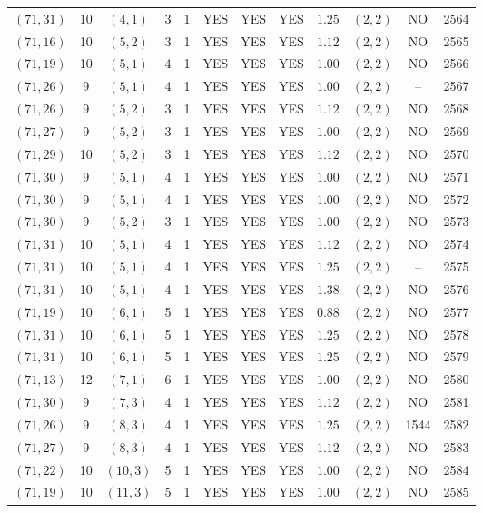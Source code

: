 \begin{longtable}{|c|c|c|c|c|c|c|c|c|c|c|c|}
$(71,31)$ & 10 & $(4,1)$ & 3 & 1 & YES & YES & YES & $1.25$ & $(2,2)$ & NO & 2564\\
$(71,16)$ & 10 & $(5,2)$ & 3 & 1 & YES & YES & YES & $1.12$ & $(2,2)$ & NO & 2565\\
$(71,19)$ & 10 & $(5,1)$ & 4 & 1 & YES & YES & YES & $1.00$ & $(2,2)$ & NO & 2566\\
$(71,26)$ & 9 & $(5,1)$ & 4 & 1 & YES & YES & YES & $1.00$ & $(2,2)$ & -- & 2567\\
$(71,26)$ & 9 & $(5,2)$ & 3 & 1 & YES & YES & YES & $1.12$ & $(2,2)$ & NO & 2568\\
$(71,27)$ & 9 & $(5,2)$ & 3 & 1 & YES & YES & YES & $1.00$ & $(2,2)$ & NO & 2569\\
$(71,29)$ & 10 & $(5,2)$ & 3 & 1 & YES & YES & YES & $1.12$ & $(2,2)$ & NO & 2570\\
$(71,30)$ & 9 & $(5,1)$ & 4 & 1 & YES & YES & YES & $1.00$ & $(2,2)$ & NO & 2571\\
$(71,30)$ & 9 & $(5,1)$ & 4 & 1 & YES & YES & YES & $1.00$ & $(2,2)$ & NO & 2572\\
$(71,30)$ & 9 & $(5,2)$ & 3 & 1 & YES & YES & YES & $1.00$ & $(2,2)$ & NO & 2573\\
$(71,31)$ & 10 & $(5,1)$ & 4 & 1 & YES & YES & YES & $1.12$ & $(2,2)$ & NO & 2574\\
$(71,31)$ & 10 & $(5,1)$ & 4 & 1 & YES & YES & YES & $1.25$ & $(2,2)$ & -- & 2575\\
$(71,31)$ & 10 & $(5,1)$ & 4 & 1 & YES & YES & YES & $1.38$ & $(2,2)$ & NO & 2576\\
$(71,19)$ & 10 & $(6,1)$ & 5 & 1 & YES & YES & YES & $0.88$ & $(2,2)$ & NO & 2577\\
$(71,31)$ & 10 & $(6,1)$ & 5 & 1 & YES & YES & YES & $1.25$ & $(2,2)$ & NO & 2578\\
$(71,31)$ & 10 & $(6,1)$ & 5 & 1 & YES & YES & YES & $1.25$ & $(2,2)$ & NO & 2579\\
$(71,13)$ & 12 & $(7,1)$ & 6 & 1 & YES & YES & YES & $1.00$ & $(2,2)$ & NO & 2580\\
$(71,30)$ & 9 & $(7,3)$ & 4 & 1 & YES & YES & YES & $1.12$ & $(2,2)$ & NO & 2581\\
$(71,26)$ & 9 & $(8,3)$ & 4 & 1 & YES & YES & YES & $1.25$ & $(2,2)$ & 1544 & 2582\\
$(71,27)$ & 9 & $(8,3)$ & 4 & 1 & YES & YES & YES & $1.12$ & $(2,2)$ & NO & 2583\\
$(71,22)$ & 10 & $(10,3)$ & 5 & 1 & YES & YES & YES & $1.00$ & $(2,2)$ & NO & 2584\\
$(71,19)$ & 10 & $(11,3)$ & 5 & 1 & YES & YES & YES & $1.00$ & $(2,2)$ & NO & 2585\\

\end{longtable}
